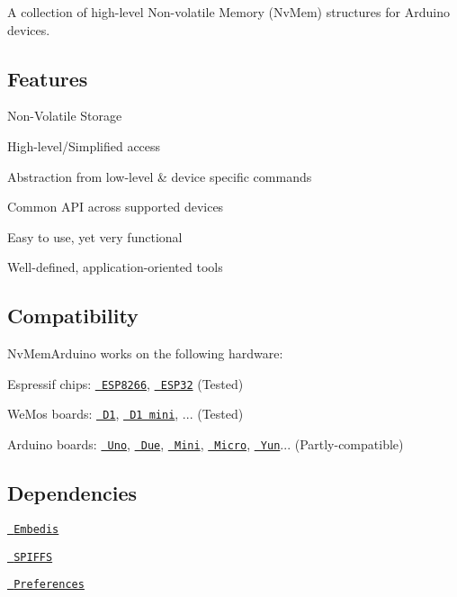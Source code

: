A collection of high-\/level Non-\/volatile Memory (Nv\+Mem) structures for Arduino devices.

\subsection*{Features}


\begin{DoxyItemize}
\item Non-\/\+Volatile Storage
\item High-\/level/\+Simplified access
\item Abstraction from low-\/level \& device specific commands
\item Common A\+PI across supported devices
\item Easy to use, yet very functional
\item Well-\/defined, application-\/oriented tools
\end{DoxyItemize}

\subsection*{Compatibility}

Nv\+Mem\+Arduino works on the following hardware\+:


\begin{DoxyItemize}
\item  Espressif chips\+: \href{https://en.wikipedia.org/wiki/ESP8266}{\texttt{ E\+S\+P8266}}, \href{https://en.wikipedia.org/wiki/ESP32}{\texttt{ E\+S\+P32}} (Tested)
\item  We\+Mos boards\+: \href{https://wiki.wemos.cc/products:d1:d1}{\texttt{ D1}}, \href{https://wiki.wemos.cc/products:d1:d1_mini}{\texttt{ D1 mini}}, ... (Tested)
\item  Arduino boards\+: \href{https://www.arduino.cc/en/Main/ArduinoBoardUno}{\texttt{ Uno}}, \href{https://www.arduino.cc/en/Main/ArduinoBoardDue}{\texttt{ Due}}, \href{https://www.arduino.cc/en/Main/ArduinoBoardMini}{\texttt{ Mini}}, \href{https://www.arduino.cc/en/Main/ArduinoBoardMicro}{\texttt{ Micro}}, \href{https://www.arduino.cc/en/Main/ArduinoBoardYun}{\texttt{ Yun}}... (Partly-\/compatible)
\end{DoxyItemize}

\subsection*{Dependencies}


\begin{DoxyItemize}
\item \href{https://github.com/thingSoC/embedis}{\texttt{ Embedis}}
\item \href{https://arduino-esp8266.readthedocs.io/en/latest/filesystem.html}{\texttt{ S\+P\+I\+F\+FS}}
\item \href{https://github.com/espressif/arduino-esp32/tree/master/libraries/Preferences}{\texttt{ Preferences}}
\end{DoxyItemize}

